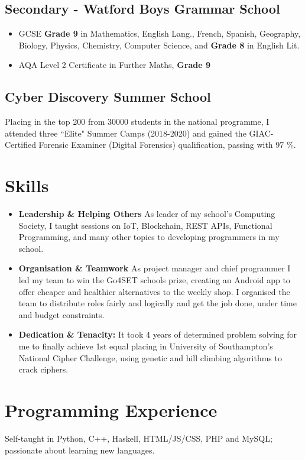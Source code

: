 \documentclass{Resume}
\begin{document}
		\subsection{Secondary - Watford Boys Grammar School}
				\begin{itemize}
					\item GCSE \textbf{Grade 9} in Mathematics, English Lang., French, Spanish, Geography, Biology, Physics, Chemistry, Computer Science, and \textbf{Grade 8} in English Lit.
					\item AQA Level 2 Certificate in Further Maths, \textbf{Grade 9}
				\end{itemize}
		\subsection{Cyber Discovery Summer School}
				Placing in the top 200 from 30000 students in the national programme, I attended three ``Elite" Summer Camps (2018-2020) and gained the GIAC-Certified Forensic Examiner (Digital Forensics) qualification, passing with 97 \%.


	\section{Skills}
			\begin{itemize}
				\item \textbf{Leadership \& Helping Others} As leader of my school's Computing Society, I taught sessions on IoT, Blockchain, REST APIs, Functional Programming, and many other topics to developing programmers in my school.
				\item \textbf{Organisation \& Teamwork} As project manager and chief programmer I led my team to win the Go4SET schools prize, creating an Android app to offer cheaper and healthier alternatives to the weekly shop. I organised the team to distribute roles fairly and logically and get the job done, under time and budget constraints.
				\item \textbf{Dedication \& Tenacity:}  It took 4 years of determined problem solving for me to finally achieve 1st equal placing in University of Southampton's National Cipher Challenge, using genetic and hill climbing algorithms to crack ciphers.
			\end{itemize}		

		\newpage
	\section{Programming Experience}
			Self-taught in Python, C++, Haskell, HTML/JS/CSS, PHP and MySQL; passionate about learning new languages.
\end{document}
